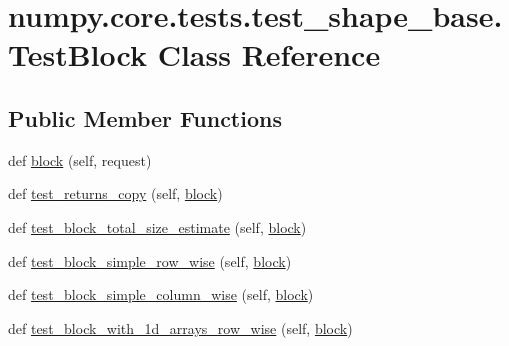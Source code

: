 \hypertarget{classnumpy_1_1core_1_1tests_1_1test__shape__base_1_1TestBlock}{}\section{numpy.\+core.\+tests.\+test\+\_\+shape\+\_\+base.\+Test\+Block Class Reference}
\label{classnumpy_1_1core_1_1tests_1_1test__shape__base_1_1TestBlock}
\subsection*{Public Member Functions}
\begin{DoxyCompactItemize}
\item 
def \hyperlink{classnumpy_1_1core_1_1tests_1_1test__shape__base_1_1TestBlock_a620b76e025cdd21f1afd8650278b981b}{block} (self, request)
\item 
def \hyperlink{classnumpy_1_1core_1_1tests_1_1test__shape__base_1_1TestBlock_a5af3e2f026ef5b5b53d9ab0217c4258b}{test\+\_\+returns\+\_\+copy} (self, \hyperlink{classnumpy_1_1core_1_1tests_1_1test__shape__base_1_1TestBlock_a620b76e025cdd21f1afd8650278b981b}{block})
\item 
def \hyperlink{classnumpy_1_1core_1_1tests_1_1test__shape__base_1_1TestBlock_a1e2057d25596853a9577c9a95a7550e3}{test\+\_\+block\+\_\+total\+\_\+size\+\_\+estimate} (self, \hyperlink{classnumpy_1_1core_1_1tests_1_1test__shape__base_1_1TestBlock_a620b76e025cdd21f1afd8650278b981b}{block})
\item 
def \hyperlink{classnumpy_1_1core_1_1tests_1_1test__shape__base_1_1TestBlock_a5b5c82fe8ba4351f0cf707c35014e027}{test\+\_\+block\+\_\+simple\+\_\+row\+\_\+wise} (self, \hyperlink{classnumpy_1_1core_1_1tests_1_1test__shape__base_1_1TestBlock_a620b76e025cdd21f1afd8650278b981b}{block})
\item 
def \hyperlink{classnumpy_1_1core_1_1tests_1_1test__shape__base_1_1TestBlock_ae58c85531bb1a2bd8cbf255d6b2745f7}{test\+\_\+block\+\_\+simple\+\_\+column\+\_\+wise} (self, \hyperlink{classnumpy_1_1core_1_1tests_1_1test__shape__base_1_1TestBlock_a620b76e025cdd21f1afd8650278b981b}{block})
\item 
def \hyperlink{classnumpy_1_1core_1_1tests_1_1test__shape__base_1_1TestBlock_a56e84b591d5421b13c497b2b257838c9}{test\+\_\+block\+\_\+with\+\_\+1d\+\_\+arrays\+\_\+row\+\_\+wise} (self, \hyperlink{classnumpy_1_1core_1_1tests_1_1test__shape__base_1_1TestBlock_a620b76e025cdd21f1afd8650278b981b}{block})

\end{DoxyCompactItemize}
